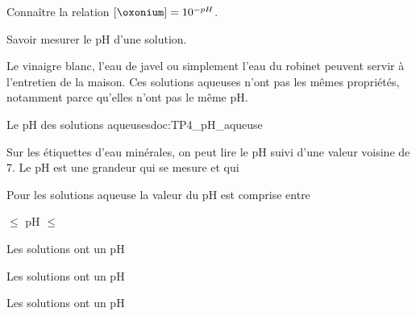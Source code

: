 \tetePremStssChim

\vspace*{-36pt}

\begin{objectifs}
  \item Connaître la relation $[\oxonium] = 10^{-pH}$.
  \item Savoir mesurer le pH d'une solution.
\end{objectifs}


\begin{contexte}
  Le vinaigre blanc, l'eau de javel ou simplement l'eau du robinet peuvent servir à l'entretien de la maison.
  Ces solutions aqueuses n'ont pas les mêmes propriétés, notamment parce qu'elles n'ont pas le même pH.

\end{contexte}


\begin{doc}{Le pH des solutions aqueuses}{doc:TP4_pH_aqueuse}
  \begin{wrapfigure}[3]{r}{0.1\linewidth}
  \end{wrapfigure}
  
  Sur les étiquettes d'eau minérales, on peut lire le pH suivi d'une valeur voisine de 7.
  Le pH est une grandeur qui se mesure et qui 
  
  \begin{importants}
    Pour les solutions aqueuse la valeur du pH est comprise entre
    \begin{center}
       $\leq$ pH $\leq$ 
    \end{center}
  \end{importants}

  \begin{importants}
    \begin{listePoints}
      \item Les solutions  ont un pH 
      \item Les solutions  ont un pH 
      \item Les solutions  ont un pH 
    \end{listePoints}
  \end{importants}
\end{doc}

